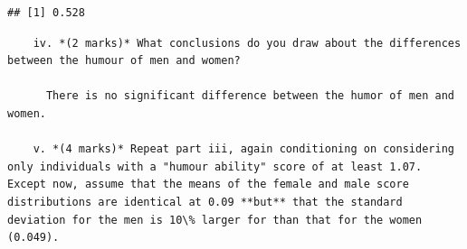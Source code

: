 \documentclass[
  9pt,
]{article}
\newenvironment{Shaded}{\begin{snugshade}}{\end{snugshade}}
\newcommand{\CommentTok}[1]{\textcolor[rgb]{0.56,0.35,0.01}{\textit{#1}}}
\newcommand{\ControlFlowTok}[1]{\textcolor[rgb]{0.13,0.29,0.53}{\textbf{#1}}}
\newcommand{\DataTypeTok}[1]{\textcolor[rgb]{0.13,0.29,0.53}{#1}}
\newcommand{\DecValTok}[1]{\textcolor[rgb]{0.00,0.00,0.81}{#1}}
\newcommand{\FloatTok}[1]{\textcolor[rgb]{0.00,0.00,0.81}{#1}}
\newcommand{\KeywordTok}[1]{\textcolor[rgb]{0.13,0.29,0.53}{\textbf{#1}}}
\newcommand{\NormalTok}[1]{#1}
\newcommand{\OperatorTok}[1]{\textcolor[rgb]{0.81,0.36,0.00}{\textbf{#1}}}
\newcommand{\StringTok}[1]{\textcolor[rgb]{0.31,0.60,0.02}{#1}}
\begin{document}
\begin{verbatim}
## [1] 0.528
\end{verbatim}

\begin{verbatim}
    iv. *(2 marks)* What conclusions do you draw about the differences between the humour of men and women?
      
      There is no significant difference between the humor of men and women.
    
    v. *(4 marks)* Repeat part iii, again conditioning on considering only individuals with a "humour ability" score of at least 1.07.   Except now, assume that the means of the female and male score distributions are identical at 0.09 **but** that the standard deviation for the men is 10\% larger for than that for the women (0.049).
    
\end{verbatim}

\begin{Shaded}
\end{Shaded}
\end{document}
